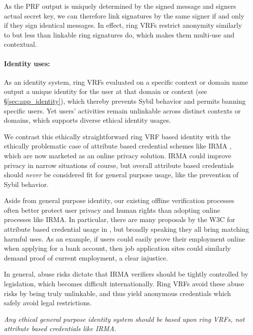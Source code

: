 As the PRF output is uniquely determined by the signed message and
signers actual secret key, we can therefore link signatures by the
same signer if and only if they sign identical messages.
In effect, ring VRFs restrict anonymity similarly to but less than
 linkable ring signatures do, which makes them multi-use and contextual.

\paragraph{Identity uses:}

As an identity system, ring VRFs evaluated on a specific context or
domain name output a unique identity for the user at that domain or
context (see \S\ref{sec:app_identity}), which thereby prevents
Sybil behavior and permits banning specific users.
Yet users' activities remain unlinkable across distinct contexts or
domains, which supports diverse ethical identity usages.

We contrast this ethically straightforward ring VRF based identity
with the ethically problematic case of attribute based credential
schemes like IRMA \cite{IRMA_credentials},
 which are now marketed as an online privacy solution.
IRMA could improve privacy in narrow situations of course, but
overall attribute based credentials should {\it never} be considered
fit for general purpose usage, like the prevention of Sybil behavior.

Aside from general purpose identity, our existing offline
verification processes often better protect user privacy and human
rights than adopting online processes like IRMA.
%
In particular, there are many proposals by the W3C for attribute based
credential usage in \cite{w3c_vc_use_cases}, but broadly speaking they
all bring matching harmful uses.  %
As an example, if users could easily prove their employment online when
applying for a bank account, then job application sites could similarly
demand proof of current employment, a clear injustice.

In general, abuse risks dictate that IRMA verifiers should be tightly
controlled by legislation, which becomes difficult internationally. 
%
Ring VRFs avoid these abuse risks by being truly unlinkable, and thus
yield anonymous credentials which safely avoid legal restrictions.

{\it Any ethical general purpose identity system should be based
upon ring VRFs, not attribute based credentials like IRMA.}

